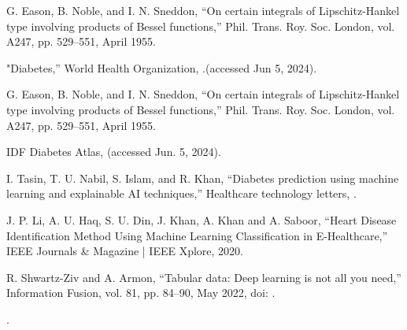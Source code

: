 \documentclass[conference]{IEEEtran}
\begin{document}
\clearpage
\begin{thebibliography}{00}
 G. Eason, B. Noble, and I. N. Sneddon, ``On certain integrals of Lipschitz-Hankel type involving products of Bessel functions,'' Phil. Trans. Roy. Soc. London, vol. A247, pp. 529--551, April 1955.

 "Diabetes,” World Health Organization, .(accessed Jun 5, 2024).

 G. Eason, B. Noble, and I. N. Sneddon, ``On certain integrals of Lipschitz-Hankel type involving products of Bessel functions,'' Phil. Trans. Roy. Soc. London, vol. A247, pp. 529--551, April 1955.

IDF Diabetes Atlas,  (accessed Jun. 5, 2024).

I. Tasin, T. U. Nabil, S. Islam, and R. Khan, “Diabetes prediction using machine learning and explainable AI techniques,” Healthcare technology letters, 
. 

 J. P. Li, A. U. Haq, S. U. Din, J. Khan, A. Khan and A. Saboor, “Heart Disease Identification Method Using Machine Learning Classification in E-Healthcare,” IEEE Journals \& Magazine | IEEE Xplore, 2020. 


 R. Shwartz-Ziv and A. Armon, “Tabular data: Deep learning is not all you need,” Information Fusion, vol. 81, pp. 84–90, May 2022, doi: 
.

.


\end{thebibliography}
\end{document}
